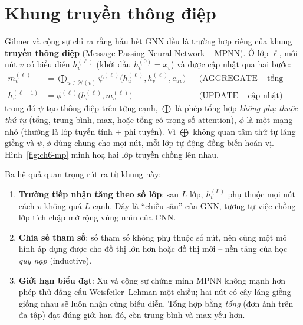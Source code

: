 \section{Khung truyền thông điệp}
\label{sec:gnn-mp}

Gilmer và cộng sự \cite{ch6:gilmer2017} chỉ ra rằng hầu hết GNN đều là trường hợp riêng của khung
\textbf{truyền thông điệp} (Message Passing Neural Network -- MPNN). Ở lớp $\ell$, mỗi nút $v$ có biểu diễn $h_v^{(\ell)}$
(khởi đầu $h_v^{(0)}=x_v$) và được cập nhật qua hai bước:
\begin{align}
  m_v^{(\ell)} &= \bigoplus_{u\in\mathcal N(v)} \psi^{(\ell)}\!\big(h_u^{(\ell)}, h_v^{(\ell)}, e_{uv}\big)
  && \text{(AGGREGATE -- tổng hợp thông điệp)} \label{eq:ch6-agg}\\
  h_v^{(\ell+1)} &= \phi^{(\ell)}\!\big(h_v^{(\ell)}, m_v^{(\ell)}\big)
  && \text{(UPDATE -- cập nhật)} \label{eq:ch6-upd}
\end{align}
trong đó $\psi$ tạo thông điệp trên từng cạnh, $\bigoplus$ là phép tổng hợp \emph{không phụ thuộc thứ tự} (tổng,
trung bình, max, hoặc tổng có trọng số attention), $\phi$ là một mạng nhỏ (thường là lớp tuyến tính + phi tuyến).
Vì $\bigoplus$ không quan tâm thứ tự láng giềng và $\psi,\phi$ dùng chung cho mọi nút, mỗi lớp tự động đồng biến hoán
vị. Hình~\ref{fig:ch6-mp} minh hoạ hai lớp truyền chồng lên nhau.


Ba hệ quả quan trọng rút ra từ khung này:
\begin{enumerate}
  \item \textbf{Trường tiếp nhận tăng theo số lớp}: sau $L$ lớp, $h_v^{(L)}$ phụ thuộc mọi nút cách $v$ không quá $L$
        cạnh. Đây là ``chiều sâu'' của GNN, tương tự việc chồng lớp tích chập mở rộng vùng nhìn của CNN.
  \item \textbf{Chia sẻ tham số}: số tham số không phụ thuộc số nút, nên cùng một mô hình áp dụng được cho đồ thị
        lớn hơn hoặc đồ thị mới -- nền tảng của học \emph{quy nạp} (inductive).
  \item \textbf{Giới hạn biểu đạt}: Xu và cộng sự \cite{ch6:xu2019gin} chứng minh MPNN không mạnh hơn phép thử đẳng cấu
        Weisfeiler--Lehman một chiều; hai nút có cây láng giềng giống nhau sẽ luôn nhận cùng biểu diễn. Tổng hợp bằng
        \emph{tổng} (đơn ánh trên đa tập) đạt đúng giới hạn đó, còn trung bình và max yếu hơn.
\end{enumerate}

